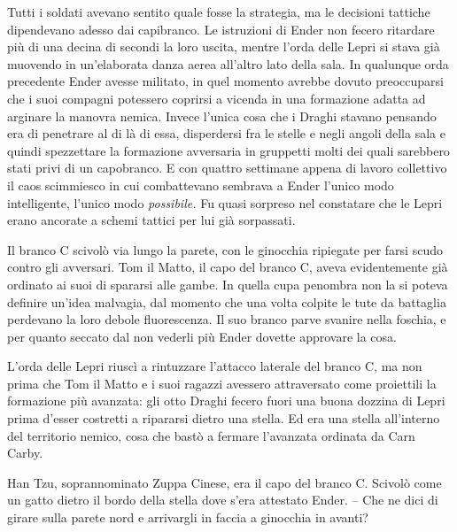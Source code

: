 {Tutti i soldati avevano sentito quale fosse la strategia, ma le
	decisioni tattiche dipendevano adesso dai capibranco. Le istruzioni di
	Ender non fecero ritardare più di una decina di secondi la loro uscita,
	mentre l'orda delle Lepri si stava già muovendo in un'elaborata danza
	aerea all'altro lato della sala. In qualunque orda precedente Ender
	avesse militato, in quel momento avrebbe dovuto preoccuparsi che i suoi
	compagni potessero coprirsi a vicenda in una formazione adatta ad
	arginare la manovra nemica. Invece l'unica cosa che i Draghi stavano
	pensando era di penetrare al di là di essa, disperdersi fra le stelle e
	negli angoli della sala e quindi spezzettare la formazione avversaria in
	gruppetti molti dei quali sarebbero stati privi di un capobranco. E con
	quattro settimane appena di lavoro collettivo il caos scimmiesco in cui
	combattevano sembrava a Ender l'unico modo intelligente, l'unico modo
	\emph{possibile.} Fu quasi sorpreso nel constatare che le Lepri erano
	ancorate a schemi tattici per lui già sorpassati.}

{Il branco C scivolò via lungo la parete, con le ginocchia ripiegate per
	farsi scudo contro gli avversari. Tom il Matto, il capo del branco C,
	aveva evidentemente già ordinato ai suoi di spararsi alle gambe. In
	quella cupa penombra non la si poteva definire un'idea malvagia, dal
	momento che una volta colpite le tute da battaglia perdevano la loro
	debole fluorescenza. Il suo branco parve svanire nella foschia, e per
	quanto seccato dal non vederli più Ender dovette approvare la cosa.}

{L'orda delle Lepri riuscì a rintuzzare l'attacco laterale del branco C,
	ma non prima che Tom il Matto e i suoi ragazzi avessero attraversato
	come proiettili la formazione più avanzata: gli otto Draghi fecero fuori
	una buona dozzina di Lepri prima d'esser costretti a ripararsi dietro
	una stella. Ed era una stella all'interno del territorio nemico, cosa
	che bastò a fermare l'avanzata ordinata da Carn Carby.}

{Han Tzu, soprannominato Zuppa Cinese, era il capo del branco C. Scivolò
	come un gatto dietro il bordo della stella dove s'era attestato Ender.
	-- Che ne dici di girare sulla parete nord e arrivargli in faccia a
	ginocchia in avanti?}


